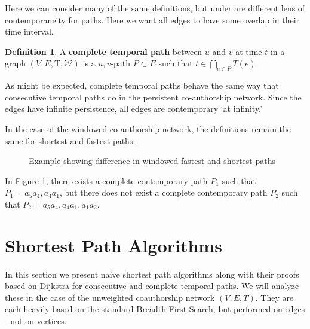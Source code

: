 \documentclass{article}
\theoremstyle{definition}
\newtheorem{defn}[thm]{Definition}
\numberwithin{thm}{subsection}
\newcommand{\W}{\mathcal{W}}
\newcommand{\T}{\text{T}}
\begin{document}
Here we can consider many of the same definitions, but under are different
lens of contemporaneity for paths. Here we want all edges to have some overlap
in their time interval.

\begin{defn}
  A \textbf{complete temporal path} between $u$ and $v$ at time $t$ in a graph
  $(V,E, \T,\W)$ is a $u,v$-path $P \subset E$ such that
  $t \in \bigcap_{e \in P} T(e)$.
\end{defn}

As might be expected, complete temporal paths behave the same way
that consecutive temporal paths do in the persistent co-authorship network.
Since the edges have infinite persistence, all edges are contemporary `at
infinity.'

In the case of the windowed co-authorship network, the definitions remain the
same for shortest and fastest paths.

\begin{figure}[h] \centering
  \caption{Example showing difference in windowed fastest and shortest paths}
  \label{fig:windowed_path_ex}
\end{figure}

In Figure \ref{fig:windowed_path_ex}, there exists a complete contemporary path
$P_1$ such that $P_1 = a_5a_4,a_4a_1$, but there does not exist a complete
contemporary path $P_2$ such that $P_2 = a_5a_4,a_4a_1,a_1a_2$.

\section{ Shortest Path Algorithms}

In this section we present naive shortest path algorithms along with their proofs
based on Dijkstra for consecutive and complete temporal paths. We will analyze
these in the case of the unweighted coauthorship network $(V,E,T)$. They are each
heavily based on the standard Breadth First Search, but performed on edges -
not on vertices.
\end{document}
